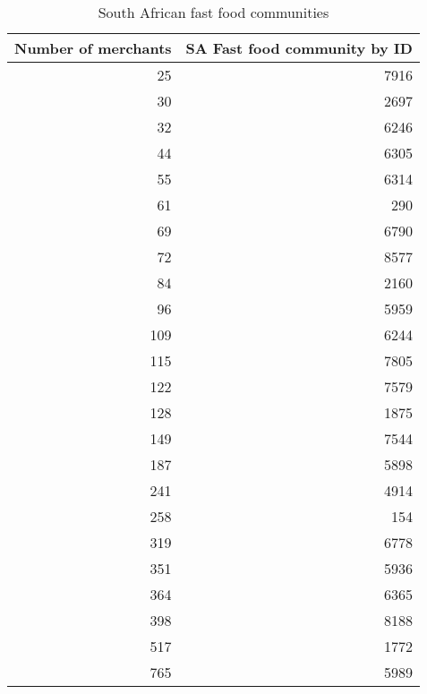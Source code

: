 \begin{center}
    \begin{table}[]
        \centering
            \begin{tabular}{rr}
            \toprule
             Number of merchants &  SA Fast food community by ID \\
            \midrule
                      25 &                     7916 \\
                      30 &                     2697 \\
                      32 &                     6246 \\
                      44 &                     6305 \\
                      55 &                     6314 \\
                      61 &                      290 \\
                      69 &                     6790 \\
                      72 &                     8577 \\
                      84 &                     2160 \\
                      96 &                     5959 \\
                     109 &                     6244 \\
                     115 &                     7805 \\
                     122 &                     7579 \\
                     128 &                     1875 \\
                     149 &                     7544 \\
                     187 &                     5898 \\
                     241 &                     4914 \\
                     258 &                      154 \\
                     319 &                     6778 \\
                     351 &                     5936 \\
                     364 &                     6365 \\
                     398 &                     8188 \\
                     517 &                     1772 \\
                     765 &                     5989 \\
            \bottomrule
            \end{tabular}
        \caption{South African fast food communities}
        \label{tab:sa_fastfood_communites}
    \end{table}
\end{center}

